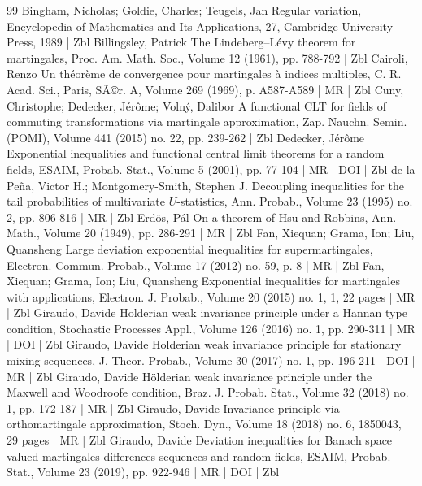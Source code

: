 \begin{thebibliography}{99}
 Bingham, Nicholas; Goldie, Charles; Teugels, Jan Regular variation, Encyclopedia of Mathematics and Its Applications, 27, Cambridge University Press, 1989 | Zbl
 Billingsley, Patrick The Lindeberg–Lévy theorem for martingales, Proc. Am. Math. Soc., Volume 12 (1961), pp. 788-792 | Zbl
 Cairoli, Renzo Un théorème de convergence pour martingales à indices multiples, C. R. Acad. Sci., Paris, SÃ©r. A, Volume 269 (1969), p. A587-A589 | MR | Zbl
 Cuny, Christophe; Dedecker, Jérôme; Volný, Dalibor A functional CLT for fields of commuting transformations via martingale approximation, Zap. Nauchn. Semin. (POMI), Volume 441 (2015) no. 22, pp. 239-262 | Zbl
 Dedecker, Jérôme Exponential inequalities and functional central limit theorems for a random fields, ESAIM, Probab. Stat., Volume 5 (2001), pp. 77-104 | MR | DOI | Zbl
 de la Peña, Victor H.; Montgomery-Smith, Stephen J. Decoupling inequalities for the tail probabilities of multivariate $U$-statistics, Ann. Probab., Volume 23 (1995) no. 2, pp. 806-816 | MR | Zbl
 Erdös, Pál On a theorem of Hsu and Robbins, Ann. Math., Volume 20 (1949), pp. 286-291 | MR | Zbl
 Fan, Xiequan; Grama, Ion; Liu, Quansheng Large deviation exponential inequalities for supermartingales, Electron. Commun. Probab., Volume 17 (2012) no. 59, p. 8 | MR | Zbl
 Fan, Xiequan; Grama, Ion; Liu, Quansheng Exponential inequalities for martingales with applications, Electron. J. Probab., Volume 20 (2015) no. 1, 1, 22 pages | MR | Zbl
 Giraudo, Davide Holderian weak invariance principle under a Hannan type condition, Stochastic Processes Appl., Volume 126 (2016) no. 1, pp. 290-311 | MR | DOI | Zbl
 Giraudo, Davide Holderian weak invariance principle for stationary mixing sequences, J. Theor. Probab., Volume 30 (2017) no. 1, pp. 196-211 | DOI | MR | Zbl
 Giraudo, Davide Hölderian weak invariance principle under the Maxwell and Woodroofe condition, Braz. J. Probab. Stat., Volume 32 (2018) no. 1, pp. 172-187 | MR | Zbl
 Giraudo, Davide Invariance principle via orthomartingale approximation, Stoch. Dyn., Volume 18 (2018) no. 6, 1850043, 29 pages | MR | Zbl
 Giraudo, Davide Deviation inequalities for Banach space valued martingales differences sequences and random fields, ESAIM, Probab. Stat., Volume 23 (2019), pp. 922-946 | MR | DOI | Zbl

\end{thebibliography}
